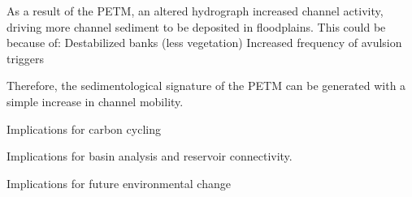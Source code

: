 \documentclass[draft]{compact_proposal}
\begin{document}
As a result of the PETM, an altered hydrograph increased channel activity, driving more channel sediment to be deposited in floodplains. This could be because of:
    Destabilized banks (less vegetation)
    Increased frequency of avulsion triggers

Therefore, the sedimentological signature of the PETM can be generated with a simple increase in channel mobility.

Implications for carbon cycling

Implications for basin analysis and reservoir connectivity.

Implications for future environmental change


\printbibliography
\end{document}
